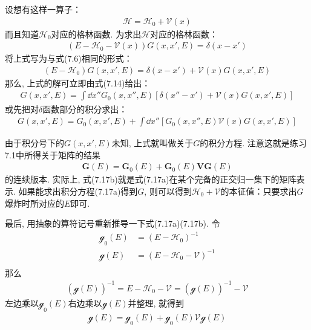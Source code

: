 设想有这样一算子：
\begin{align*}
\mathscr{H = H}_0 + \mathscr{V}(x)
\end{align*}
而且知道$\mathscr{H}_0$对应的格林函数. 为求出$\mathscr{H}$对应的格林函数：
\begin{align}
(E - \mathscr{H}_0 - \mathscr{V}(x))G(x,x',E) = \delta(x-x')
\end{align}
将上式写为与式(7.6)相同的形式：
\begin{align*}
(E - \mathscr{H}_0) G(x,x',E) = \delta(x-x') + \mathscr{V}(x)G(x,x',E)
\end{align*}
那么, 上式的解可立即由式(7.14)给出：
\begin{align*}
G(x,x',E) = \int\dd x'' G_0(x,x'',E) [ \delta(x''-x') + \mathscr{V}(x)G(x,x',E) ]
\end{align*}
或先把对$\delta$函数部分的积分求出：
\begin{align}
G(x,x',E) = G_0(x,x',E) + \int\dd x'' [G_0(x,x'',E) \mathscr{V}(x)G(x,x',E) ]\tag{7.17a}
\end{align}
\addtocounter{equation}{1}
由于积分号下的$G(x,x',E)$未知, 上式就叫做关于$G$的积分方程. 注意这就是练习7.1中所得关于矩阵的结果
\begin{align}
\mathbf{G}(E) = \mathbf{G}_0(E) + \mathbf{G}_0(E)\mathbf{VG}(E)\tag{7.17b}
\end{align}
的连续版本. 实际上, 式(7.17b)就是式(7.17a)在某个完备的正交归一集下的矩阵表示. 如果能求出积分方程(7.17a)得到$G$, 则可以得到$\mathscr{H}_0 + \mathscr{V}$的本征值：只要求出$G$爆炸时所对应的$E$即可.

最后, 用抽象的算符记号重新推导一下式(7.17a)(7.17b). 令
\begin{align*}
\mathscr{g}_0(E) & = (E-\mathscr{H}_0)^{-1}\\
\mathscr{g}(E)   & = (E-\mathscr{H}_0 - \mathscr{V})^{-1}\\
\end{align*}
那么
\begin{align}
( \mathscr{g}(E) )^{-1} = E - \mathscr{H}_0 - \mathscr{V} = (\mathscr{g}(E))^{-1} - \mathscr{V} 
\end{align}
左边乘以$\mathscr{g}_0(E)$右边乘以$\mathscr{g}(E)$并整理, 就得到
\begin{align}
\mathscr{g}(E) = \mathscr{g}_0(E) + \mathscr{g}_0(E)\mathscr{V}\mathscr{g}(E) 
\end{align}


